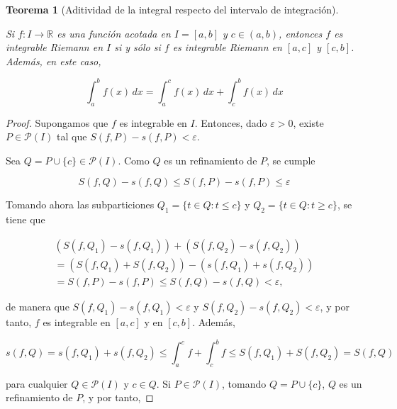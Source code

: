 \documentclass[
  a4paper,
]{scrreport}
\theoremstyle{definition}
\theoremstyle{plain}
\theoremstyle{definition}
\theoremstyle{definition}
\theoremstyle{plain}
\newtheorem{theorem}{Teorema}[chapter]
\theoremstyle{plain}
\theoremstyle{remark}
\begin{document}
\begin{theorem}[Aditividad de la integral respecto del intervalo de
integración]\protect\hypertarget{thm-aditividad-integral-intervalo}{}\label{thm-aditividad-integral-intervalo}

Si \(f:I\to\mathbb{R}\) es una función acotada en \(I=[a,b]\) y
\(c\in(a,b)\), entonces \(f\) es integrable Riemann en \(I\) si y sólo
si \(f\) es integrable Riemann en \([a,c]\) y \([c,b]\). Además, en este
caso,

\[
\int_a^b f(x)\,dx = \int_a^c f(x)\,dx + \int_c^b f(x)\,dx
\]

\end{theorem}

\begin{tcolorbox}[enhanced jigsaw, leftrule=.75mm, colbacktitle=quarto-callout-note-color!10!white, toprule=.15mm, opacityback=0, opacitybacktitle=0.6, toptitle=1mm, breakable, bottomtitle=1mm, colframe=quarto-callout-note-color-frame, rightrule=.15mm, titlerule=0mm, title=\textcolor{quarto-callout-note-color}{\faInfo}\hspace{0.5em}{Demostración}, arc=.35mm, left=2mm, bottomrule=.15mm, colback=white, coltitle=black]

\begin{proof}
Supongamos que \(f\) es integrable en \(I\). Entonces, dado
\(\varepsilon>0\), existe \(P\in\mathcal{P}(I)\) tal que
\(S(f,P)-s(f,P)<\varepsilon\).

Sea \(Q=P\cup\{c\}\in\mathcal{P}(I)\). Como \(Q\) es un refinamiento de
\(P\), se cumple

\[
S(f,Q)-s(f,Q) \leq S(f,P)-s(f,P) \leq \varepsilon
\]

Tomando ahora las subparticiones \(Q_1=\{t\in Q:t\leq c\}\) y
\(Q_2=\{t\in Q: t\geq c\}\), se tiene que

\[
\begin{gathered}
(S(f,Q_1)-s(f,Q_1)) + (S(f,Q_2)-s(f,Q_2)) \\
= (S(f,Q_1) + S(f,Q_2)) - (s(f,Q_1) + s(f,Q_2)) \\
= S(f,P) - s(f,P) \leq S(f,Q) - s(f,Q) < \varepsilon,
\end{gathered}
\]

de manera que \(S(f,Q_1)-s(f,Q_1)<\varepsilon\) y
\(S(f,Q_2)-s(f,Q_2)<\varepsilon\), y por tanto, \(f\) es integrable en
\([a,c]\) y en \([c,b]\). Además,

\[
s(f,Q) = s(f,Q_1) + s(f,Q_2) \leq \int_a^c f + \int_c^b f \leq S(f,Q_1) + S(f,Q_2) = S(f,Q)
\]

para cualquier \(Q\in\mathcal{P}(I)\) y \(c\in Q\). Si
\(P\in\mathcal{P}(I)\), tomando \(Q=P\cup \{c\}\), \(Q\) es un
refinamiento de \(P\), y por tanto,


\end{proof}
\end{tcolorbox}
\end{document}
